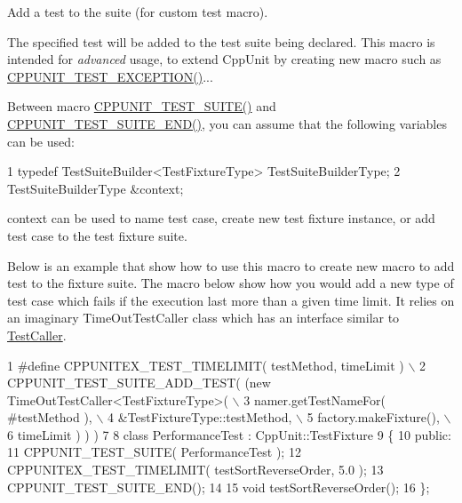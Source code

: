 Add a test to the suite (for custom test macro). 

The specified test will be added to the test suite being declared. This macro is intended for {\itshape advanced} usage, to extend Cpp\+Unit by creating new macro such as \hyperlink{group___writing_test_fixture_gaca8eeb6f60714baade6cbfd185868c40}{C\+P\+P\+U\+N\+I\+T\+\_\+\+T\+E\+S\+T\+\_\+\+E\+X\+C\+E\+P\+T\+I\+O\+N()}...

Between macro \hyperlink{group___writing_test_fixture_gabe1e12200f40d6f25d60c1783c99da81}{C\+P\+P\+U\+N\+I\+T\+\_\+\+T\+E\+S\+T\+\_\+\+S\+U\+I\+T\+E()} and \hyperlink{group___writing_test_fixture_ga601b2e1d525f3947b216e28c625abcb1}{C\+P\+P\+U\+N\+I\+T\+\_\+\+T\+E\+S\+T\+\_\+\+S\+U\+I\+T\+E\+\_\+\+E\+N\+D()}, you can assume that the following variables can be used\+: 
\begin{DoxyCode}
1 typedef TestSuiteBuilder<TestFixtureType> TestSuiteBuilderType;
2 TestSuiteBuilderType &context;
\end{DoxyCode}


{\ttfamily context} can be used to name test case, create new test fixture instance, or add test case to the test fixture suite.

Below is an example that show how to use this macro to create new macro to add test to the fixture suite. The macro below show how you would add a new type of test case which fails if the execution last more than a given time limit. It relies on an imaginary Time\+Out\+Test\+Caller class which has an interface similar to \hyperlink{class_test_caller}{Test\+Caller}.


\begin{DoxyCode}
1 #define CPPUNITEX\_TEST\_TIMELIMIT( testMethod, timeLimit )            \(\backslash\)
2      CPPUNIT\_TEST\_SUITE\_ADD\_TEST( (new TimeOutTestCaller<TestFixtureType>(  \(\backslash\)
3                  namer.getTestNameFor( #testMethod ),                \(\backslash\)
4                  &TestFixtureType::testMethod,                   \(\backslash\)
5                  factory.makeFixture(),                              \(\backslash\)
6                  timeLimit ) ) )
7   
8 class PerformanceTest : CppUnit::TestFixture
9 \{
10 public:
11   CPPUNIT\_TEST\_SUITE( PerformanceTest );
12   CPPUNITEX\_TEST\_TIMELIMIT( testSortReverseOrder, 5.0 );
13   CPPUNIT\_TEST\_SUITE\_END();
14 
15   void testSortReverseOrder();
16 \};
\end{DoxyCode}



